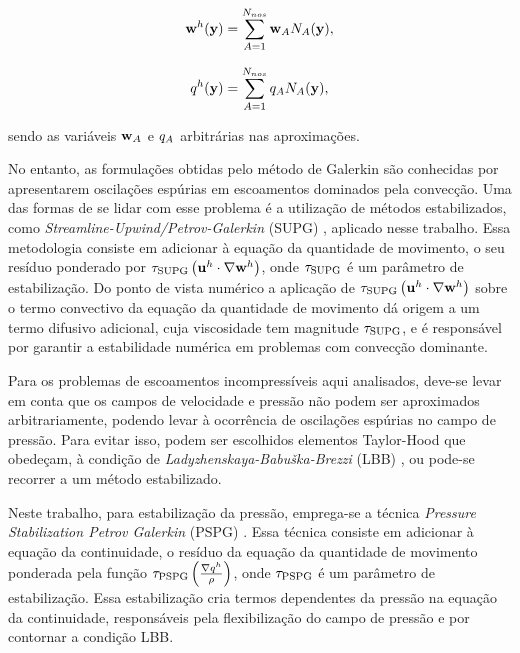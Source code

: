 \documentclass[tese_patricia]{subfiles}%
\begin{document}
\begin{align}
\mathbf{w}^{h}(\mathbf{y})  = \sum_{A = 1}^{N_{nos}} \mathbf{w}_{A}N_{A}(\mathbf{y}), \label{eq:utest}
\end{align}

\begin{align}
q^{h}(\mathbf{y})  = \sum_{A = 1}^{N_{nos}} q_{A}N_{A}(\mathbf{y}), \label{eq:ptest} 
\end{align}

\noindent sendo as variáveis $\mathbf{w}_{A}$ e $q_{A}$ arbitrárias nas aproximações.

No entanto, as formulações obtidas pelo método de Galerkin são conhecidas por apresentarem oscilações espúrias em escoamentos dominados pela convecção. Uma das formas de se lidar com esse problema é a utilização de métodos estabilizados, como \textit{Streamline-Upwind/Petrov-Galerkin} (SUPG) \cite{BrooksH:1982, HughesT:1984}, aplicado nesse trabalho. Essa metodologia consiste em adicionar à equação da quantidade de movimento, o seu resíduo ponderado por $\tau_{\mathrm{SUPG}} \left(\mathbf{u}^h \cdot \nabla\mathbf{w}^h\right)$, onde $\tau_{\mathrm{SUPG}}$ é um parâmetro de estabilização. Do ponto de vista numérico a aplicação de $\tau_{\mathrm{SUPG}} \left(\mathbf{u}^h \cdot \nabla\mathbf{w}^h\right)$ sobre o termo convectivo da equação da quantidade de movimento dá origem a um termo difusivo adicional, cuja viscosidade tem magnitude $\tau_{\mathrm{SUPG}}$, e é responsável por garantir a estabilidade numérica em problemas com convecção dominante.

Para os problemas de escoamentos incompressíveis aqui analisados, deve-se levar em conta que os campos de velocidade e pressão não podem ser aproximados arbitrariamente, podendo levar à ocorrência de oscilações espúrias no campo de pressão. Para evitar isso, podem ser escolhidos elementos Taylor-Hood que obedeçam, à condição de \textit{Ladyzhenskaya-Babuška-Brezzi} (LBB) \cite{BrezziF:1991,ZienkiewiczTN:2005,StrangF:2008}, ou pode-se recorrer a um método estabilizado. 

Neste trabalho, para estabilização da pressão, emprega-se a técnica \textit{Pressure Stabilization Petrov Galerkin} (PSPG)   \cite{HughesFB:1986,TezduyarMRS:1992a}. Essa técnica consiste em adicionar à equação da continuidade, o resíduo da equação da quantidade de movimento ponderada pela função $\tau_{\mathrm{PSPG}} \left(\frac{\nabla q^h}{\rho}\right)$, onde $\tau_{\mathrm{PSPG}}$ é um parâmetro de estabilização. Essa estabilização cria termos dependentes da pressão na equação da continuidade, responsáveis pela flexibilização do campo de pressão e por contornar a condição LBB.
\end{document}
